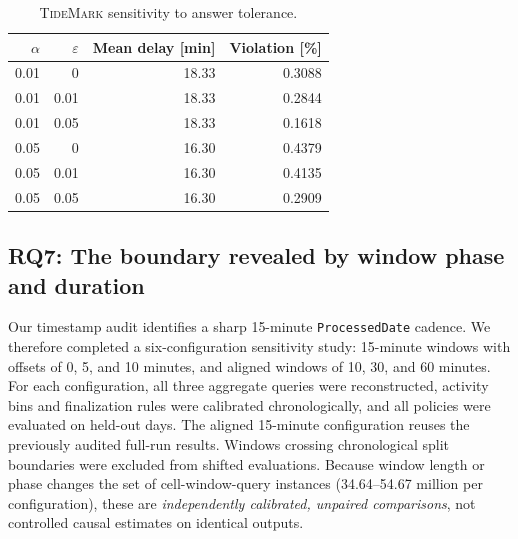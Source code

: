 \documentclass[conference]{IEEEtran}
\newcommand{\tidemark}{\textsc{TideMark}}
\newcommand{\eps}{\varepsilon}
\begin{document}
\begin{table}[t]
\caption{\tidemark{} sensitivity to answer tolerance.}
\label{tab:epsilon}
\centering
\begin{tabular}{rrrr}
\toprule
$\alpha$ & $\eps$ & Mean delay [min] & Violation [\%] \\
\midrule
0.01 & 0 & 18.33 & 0.3088 \\
0.01 & 0.01 & 18.33 & 0.2844 \\
0.01 & 0.05 & 18.33 & 0.1618 \\
\midrule
0.05 & 0 & 16.30 & 0.4379 \\
0.05 & 0.01 & 16.30 & 0.4135 \\
0.05 & 0.05 & 16.30 & 0.2909 \\
\bottomrule
\end{tabular}
\end{table}


\subsection{RQ7: The boundary revealed by window phase and duration}
\label{sec:phase}
Our timestamp audit identifies a sharp 15-minute 
\texttt{ProcessedDate} cadence. We therefore completed a six-configuration
sensitivity study: 15-minute windows with offsets of 0, 5, and 10 minutes,
and aligned windows of 10, 30, and 60 minutes. For each configuration,
all three aggregate queries were reconstructed, activity bins and
finalization rules were calibrated chronologically, and all policies
were evaluated on held-out days. The aligned 15-minute configuration
reuses the previously audited full-run results. Windows crossing
chronological split boundaries were excluded from shifted evaluations.
Because window length or phase changes the set of cell-window-query
instances (34.64--54.67 million per configuration), these are
\emph{independently calibrated, unpaired comparisons}, not controlled
causal estimates on identical outputs.

\begin{table}[t]
\centering
\caption{Six complete window configurations at $\eps=0.01$ and $\alpha=0.01$.
FG is the recalibrated fixed-global delay. Violation rates are measured on
held-out instances; dash means the comparison has a zero-delay baseline.}
\label{tab:allwindows}
\setlength{\tabcolsep}{3pt}
\end{table}
\end{document}
